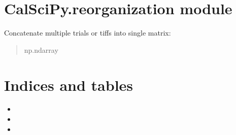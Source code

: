 \documentclass[letterpaper,10pt,english]{sphinxmanual}
\begin{document}
\sphinxstepscope


\chapter{CalSciPy.reorganization module}
\label{\detokenize{CalSciPy.reorganization:module-CalSciPy.reorganization}}\label{\detokenize{CalSciPy.reorganization:calscipy-reorganization-module}}\label{\detokenize{CalSciPy.reorganization::doc}}

\begin{fulllineitems}
\label{\detokenize{CalSciPy.reorganization:CalSciPy.reorganization.merge_traces}}
\pysigstartsignatures
{}
\pysigstopsignatures
\sphinxAtStartPar
Concatenate multiple trials or tiffs into single matrix:
\begin{quote}\begin{description}
\sphinxAtStartPar
{} \sphinxhyphen{}\sphinxhyphen{} 

\sphinxAtStartPar


\sphinxAtStartPar
np.ndarray

\end{description}\end{quote}

\end{fulllineitems}



\chapter{Indices and tables}
\label{\detokenize{index:indices-and-tables}}\begin{itemize}
\item {} 
\sphinxAtStartPar
{}

\item {} 
\sphinxAtStartPar
{}

\item {} 
\sphinxAtStartPar
{}

\end{itemize}
\end{document}
